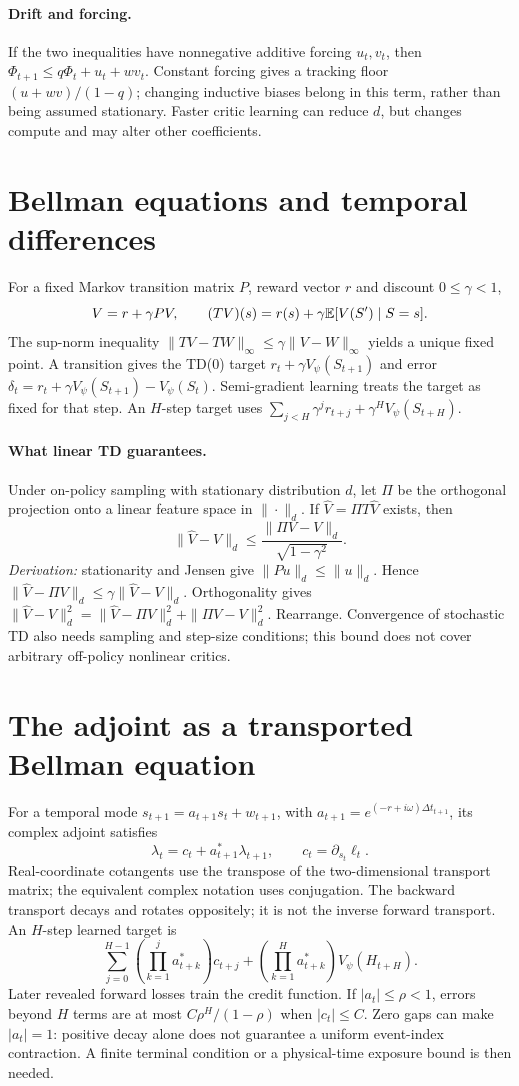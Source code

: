 \documentclass[11pt]{article}
\begin{document}
\paragraph{Drift and forcing.} If the two inequalities have nonnegative additive forcing $u_t,v_t$, then $\Phi_{t+1}\le q\Phi_t+u_t+wv_t$. Constant forcing gives a tracking floor $(u+wv)/(1-q)$; changing inductive biases belong in this term, rather than being assumed stationary. Faster critic learning can reduce $d$, but changes compute and may alter other coefficients.
\section{Bellman equations and temporal differences}
For a fixed Markov transition matrix $P$, reward vector $r$ and discount $0\le\gamma<1$,
\[
 V=r+\gamma PV,\qquad (TV)(s)=r(s)+\gamma\mathbb{E}[V(S')\mid S=s].
\]
The sup-norm inequality $\|TV-TW\|_\infty\le\gamma\|V-W\|_\infty$ yields a unique fixed point. A transition gives the TD(0) target $r_t+\gamma V_\psi(S_{t+1})$ and error $\delta_t=r_t+\gamma V_\psi(S_{t+1})-V_\psi(S_t)$. Semi-gradient learning treats the target as fixed for that step. An $H$-step target uses $\sum_{j<H}\gamma^jr_{t+j}+\gamma^HV_\psi(S_{t+H})$.
\paragraph{What linear TD guarantees.} Under on-policy sampling with stationary distribution $d$, let $\Pi$ be the orthogonal projection onto a linear feature space in $\|\cdot\|_d$. If $\widehat V=\Pi T\widehat V$ exists, then
\[
 \|\widehat V-V\|_d\le
 \frac{\|\Pi V-V\|_d}{\sqrt{1-\gamma^2}}.
\]
\emph{Derivation:} stationarity and Jensen give $\|Pu\|_d\le\|u\|_d$. Hence $\|\widehat V-\Pi V\|_d\le\gamma\|\widehat V-V\|_d$. Orthogonality gives $\|\widehat V-V\|_d^2=\|\widehat V-\Pi V\|_d^2+\|\Pi V-V\|_d^2$. Rearrange. Convergence of stochastic TD also needs sampling and step-size conditions; this bound does not cover arbitrary off-policy nonlinear critics.
\section{The adjoint as a transported Bellman equation}
For a temporal mode $s_{t+1}=a_{t+1}s_t+w_{t+1}$, with
$a_{t+1}=e^{(-r+i\omega)\Delta t_{t+1}}$, its complex adjoint satisfies
\[
 \lambda_t=c_t+a_{t+1}^{*}\lambda_{t+1},\qquad
 c_t=\partial_{s_t}\ell_t.
\]
Real-coordinate cotangents use the transpose of the two-dimensional transport matrix; the equivalent complex notation uses conjugation. The backward transport decays and rotates oppositely; it is not the inverse forward transport. An $H$-step learned target is
\[
 \sum_{j=0}^{H-1}\left(\prod_{k=1}^{j}a_{t+k}^{*}\right)c_{t+j}
 +\left(\prod_{k=1}^{H}a_{t+k}^{*}\right)V_\psi(H_{t+H}).
\]
Later revealed forward losses train the credit function. If $|a_t|\le\rho<1$, errors beyond $H$ terms are at most $C\rho^H/(1-\rho)$ when $|c_t|\le C$. Zero gaps can make $|a_t|=1$: positive decay alone does not guarantee a uniform event-index contraction. A finite terminal condition or a physical-time exposure bound is then needed.
\end{document}
